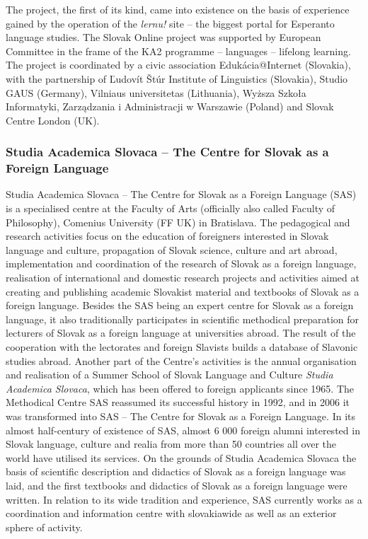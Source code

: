 \begin{multicols}{2}
The project, the first of its kind, came into existence on the basis of experience gained by the operation of the \emph{lernu!}\cite{f7} site – the biggest portal for Esperanto language studies. The Slovak Online project was supported by European Committee in the frame of the KA2 programme – languages – lifelong learning. The project is coordinated by a civic association Edukácia@Internet (Slovakia), with the partnership of Ľudovít Štúr Institute of Linguistics (Slovakia), Studio GAUS (Germany), Vilniaus universitetas (Lithuania), Wyższa Szkoła Informatyki, Zarządzania i Administracji w Warszawie (Poland) and Slovak Centre London (UK).

\subsubsection{Studia Academica Slovaca -- The Centre for Slovak as a Foreign Language}
Studia Academica Slovaca – The Centre for Slovak as a Foreign Language (SAS) is a specialised centre at the Faculty of Arts (officially also called Faculty of Philosophy), Comenius University (FF UK) in Bratislava. The pedagogical and research activities focus on the education of foreigners interested in Slovak language and culture, propagation of Slovak science, culture and art abroad, implementation and coordination of the research of Slovak as a foreign language, realisation of international and domestic research projects and activities aimed at creating and publishing academic Slovakist material and textbooks of Slovak as a foreign language. Besides the SAS being an expert centre for Slovak as a foreign language, it also traditionally participates in scientific methodical preparation for lecturers of Slovak as a foreign language at universities abroad. The result of the cooperation with the lectorates and foreign Slavists builds a database of Slavonic studies abroad.
Another part of the Centre's activities is the annual organisation and realisation of a Summer School of Slovak Language and Culture \emph{Studia Academica Slovaca}, which has been offered to foreign applicants since 1965. The Methodical Centre SAS reassumed its successful history in 1992, and in 2006 it was transformed into SAS – The Centre for Slovak as a Foreign Language. In its almost half-century of existence of SAS, almost 6 000 foreign alumni interested in Slovak language, culture and realia from more than 50 countries all over the world have  utilised its services. On the grounds of Studia Academica Slovaca the basis of scientific description and didactics of Slovak as a foreign language was laid, and the first textbooks and didactics of Slovak as a foreign language were written. In relation to its wide tradition and experience, SAS currently works as a coordination and information centre with slovakiawide as well as an exterior sphere of activity.


\end{multicols}

